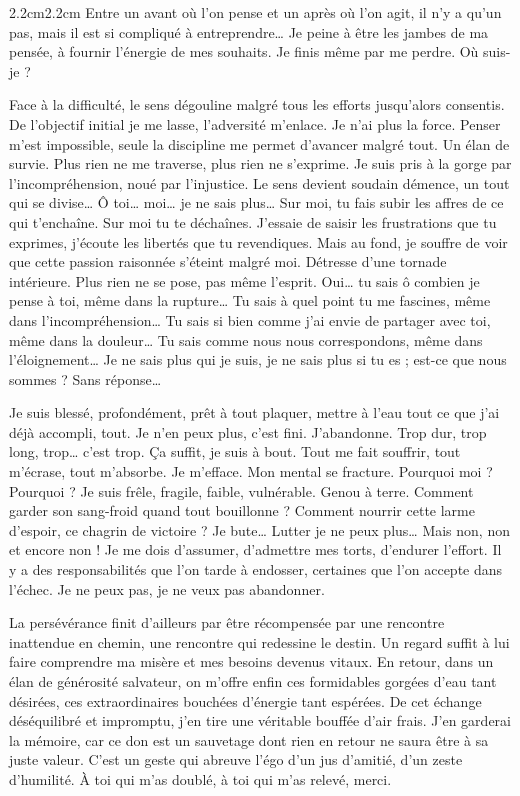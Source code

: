 \begin{adjustwidth}{2.2cm}{2.2cm}
Entre un avant où l’on pense et un après où l’on agit, il n’y a qu’un pas, mais il est si compliqué à entreprendre… Je peine à être les jambes de ma pensée, à fournir l’énergie de mes souhaits. Je finis même par me perdre. Où suis-je ?

Face à la difficulté, le sens dégouline malgré tous les efforts jusqu’alors consentis. De l’objectif initial je me lasse, l’adversité m’enlace. Je n’ai plus la force. Penser m’est impossible, seule la discipline me permet d’avancer malgré tout. Un élan de survie. Plus rien ne me traverse, plus rien ne s’exprime. Je suis pris à la gorge par l’incompréhension, noué par l’injustice.  Le sens devient soudain démence, un tout qui se divise… Ô toi… moi… je ne sais plus… Sur moi, tu fais subir les affres de ce qui t’enchaîne. Sur moi tu te déchaînes. J’essaie de saisir les frustrations que tu exprimes, j’écoute les libertés que tu revendiques. Mais au fond, je souffre de voir que cette passion raisonnée s’éteint malgré moi. Détresse d’une tornade intérieure. Plus rien ne se pose, pas même l’esprit. Oui… tu sais ô combien je pense à toi, même dans la rupture… Tu sais à quel point tu me fascines, même dans l’incompréhension… Tu sais si bien comme j’ai envie de partager avec toi, même dans la douleur… Tu sais comme nous nous correspondons, même dans l’éloignement… Je ne sais plus qui je suis, je ne sais plus si tu es ; est-ce que nous sommes ? Sans réponse…

Je suis blessé, profondément, prêt à tout plaquer, mettre à l’eau tout ce que j’ai déjà accompli, tout. Je n’en peux plus, c’est fini. J’abandonne. Trop dur, trop long, trop… c’est trop. Ça suffit, je suis à bout. Tout me fait souffrir, tout m’écrase, tout m’absorbe. Je m’efface. Mon mental se fracture. Pourquoi moi ? Pourquoi ? Je suis frêle, fragile, faible, vulnérable. Genou à terre. Comment garder son sang-froid quand tout bouillonne ? Comment nourrir cette larme d’espoir, ce chagrin de victoire ? Je bute… Lutter je ne peux plus… Mais non, non et encore non ! Je me dois d’assumer, d’admettre mes torts, d’endurer l’effort. Il y a des responsabilités que l’on tarde à endosser, certaines que l’on accepte dans l’échec. Je ne peux pas, je ne veux pas abandonner.

La persévérance finit d’ailleurs par être récompensée par une rencontre inattendue en chemin, une rencontre qui redessine le destin. Un regard suffit à lui faire comprendre ma misère et mes besoins devenus vitaux. En retour, dans un élan de générosité salvateur, on m’offre enfin ces formidables gorgées d’eau tant désirées, ces extraordinaires bouchées d’énergie tant espérées. De cet échange déséquilibré et impromptu, j’en tire une véritable bouffée d’air frais. J’en garderai la mémoire, car ce don est un sauvetage dont rien en retour ne saura être à sa juste valeur. C’est un geste qui abreuve l’égo d’un jus d’amitié, d’un zeste d’humilité. À toi qui m’as doublé, à toi qui m’as relevé, merci. 


\end{adjustwidth}
